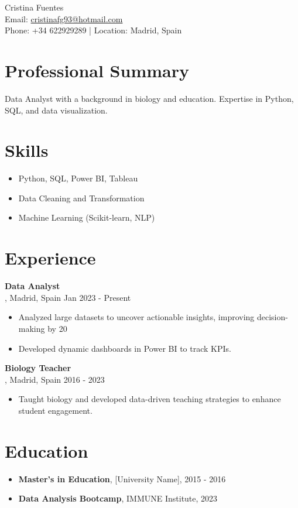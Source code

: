 \documentclass[11pt]{article}
\begin{document}
\begin{center}
    {\LARGE Cristina Fuentes} \\
    Email: \href{mailto:cristinafg93@hotmail.com}{cristinafg93@hotmail.com} \\
    Phone: +34 622929289 | Location: Madrid, Spain
\end{center}

\section*{Professional Summary}
Data Analyst with a background in biology and education. Expertise in Python, SQL, and data visualization.

\section*{Skills}
\begin{itemize}[leftmargin=*]
    \item Python, SQL, Power BI, Tableau
    \item Data Cleaning and Transformation
    \item Machine Learning (Scikit-learn, NLP)
\end{itemize}

\section*{Experience}
\textbf{Data Analyst} \\
[Company Name], Madrid, Spain \hfill Jan 2023 - Present
\begin{itemize}[leftmargin=*]
    \item Analyzed large datasets to uncover actionable insights, improving decision-making by 20%
    \item Developed dynamic dashboards in Power BI to track KPIs.
\end{itemize}

\textbf{Biology Teacher} \\
[High School Name], Madrid, Spain \hfill 2016 - 2023
\begin{itemize}[leftmargin=*]
    \item Taught biology and developed data-driven teaching strategies to enhance student engagement.
\end{itemize}

\section*{Education}
\begin{itemize}[leftmargin=*]
    \item \textbf{Master's in Education}, [University Name], 2015 - 2016
    \item \textbf{Data Analysis Bootcamp}, IMMUNE Institute, 2023
\end{itemize}
\end{document}
